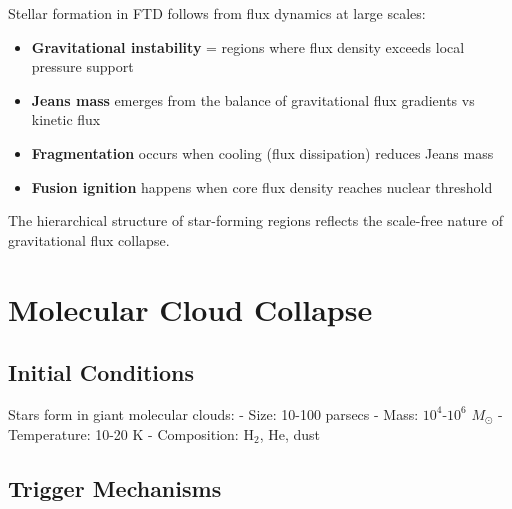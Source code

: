 \documentclass[
  11pt,
  letterpaper,
  twoside,
  openright]{book}
\providecommand{\tightlist}{%
  \setlength{\itemsep}{0pt}\setlength{\parskip}{0pt}}
\begin{document}
\begin{tcolorbox}[enhanced jigsaw, leftrule=.75mm, title=\textcolor{quarto-callout-note-color}{\faInfo}\hspace{0.5em}{How FTD Produces Stellar Formation}, bottomrule=.15mm, opacityback=0, coltitle=black, arc=.35mm, colframe=quarto-callout-note-color-frame, colbacktitle=quarto-callout-note-color!10!white, colback=white, titlerule=0mm, breakable, bottomtitle=1mm, toptitle=1mm, rightrule=.15mm, toprule=.15mm, left=2mm, opacitybacktitle=0.6]

Stellar formation in FTD follows from flux dynamics at large scales:

\begin{itemize}
\tightlist
\item
  \textbf{Gravitational instability} = regions where flux density
  exceeds local pressure support
\item
  \textbf{Jeans mass} emerges from the balance of gravitational flux
  gradients vs kinetic flux
\item
  \textbf{Fragmentation} occurs when cooling (flux dissipation) reduces
  Jeans mass
\item
  \textbf{Fusion ignition} happens when core flux density reaches
  nuclear threshold
\end{itemize}

The hierarchical structure of star-forming regions reflects the
scale-free nature of gravitational flux collapse.

\end{tcolorbox}

\section{Molecular Cloud Collapse}\label{molecular-cloud-collapse}

\subsection{Initial Conditions}\label{initial-conditions}

Stars form in giant molecular clouds: - Size: 10-100 parsecs - Mass:
\(10^4\)-\(10^6\) \(M_\odot\) - Temperature: 10-20 K - Composition:
\(\text{H}_2\), He, dust

\subsection{Trigger Mechanisms}\label{trigger-mechanisms}
\end{document}
